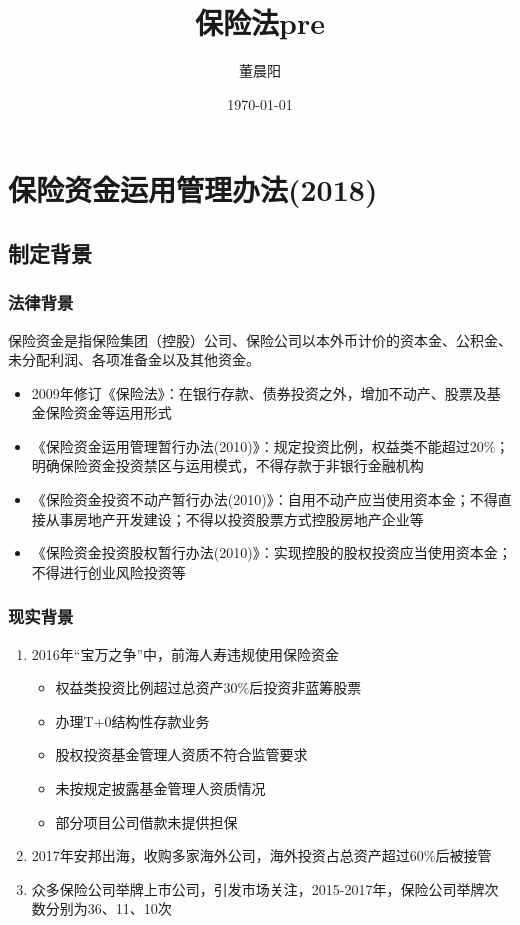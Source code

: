 \documentclass[a4paper,12pt]{ctexbeamer}
\title{保险法pre}
\author{董晨阳}
\date{\today}
\begin{document}
\clearpage
{}
\maketitle

\section{保险资金运用管理办法(2018)}
\subsection{制定背景}
\begin{frame}
    \frametitle{法律背景}
    保险资金是指保险集团（控股）公司、保险公司以本外币计价的资本金、公积金、未分配利润、各项准备金以及其他资金。
    \begin{itemize}
        \item 2009年修订《保险法》：在银行存款、债券投资之外，增加不动产、股票及基金保险资金等运用形式
        \item 《保险资金运用管理暂行办法(2010)》：规定投资比例，权益类不能超过20\%；明确保险资金投资禁区与运用模式，不得存款于非银行金融机构
        \item 《保险资金投资不动产暂行办法(2010)》：自用不动产应当使用资本金；不得直接从事房地产开发建设；不得以投资股票方式控股房地产企业等
        \item 《保险资金投资股权暂行办法(2010)》：实现控股的股权投资应当使用资本金；不得进行创业风险投资等
    \end{itemize}
\end{frame}

\begin{frame}
    \frametitle{现实背景}
    \begin{enumerate}
        \item 2016年“宝万之争”中，前海人寿违规使用保险资金
              \begin{itemize}
                  \item 权益类投资比例超过总资产30\%后投资非蓝筹股票
                  \item 办理T+0结构性存款业务
                  \item 股权投资基金管理人资质不符合监管要求
                  \item 未按规定披露基金管理人资质情况
                  \item 部分项目公司借款未提供担保
              \end{itemize}
        \item 2017年安邦出海，收购多家海外公司，海外投资占总资产超过60\%后被接管
        \item 众多保险公司举牌上市公司，引发市场关注，2015-2017年，保险公司举牌次数分别为36、11、10次
    \end{enumerate}
\end{frame}
\end{document}
